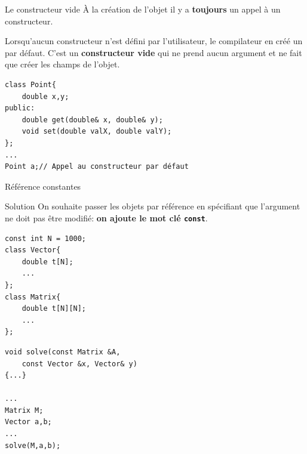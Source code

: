 \begin{frame}[fragile=singleslide]{Le constructeur vide}
    À la création de l'objet il y a \textbf{toujours} un appel à un constructeur.

    Lorsqu'aucun constructeur n'est défini par l'utilisateur, le compilateur en créé un par défaut.
    C'est un \textbf{constructeur vide} qui ne prend aucun argument et ne fait que créer les champs de l'objet.
        \begin{verbatim}
class Point{
    double x,y;
public:
    double get(double& x, double& y);
    void set(double valX, double valY);
};
...
Point a;// Appel au constructeur par défaut
        \end{verbatim}
    
\end{frame}


\begin{frame}[fragile=singleslide]{Référence constantes}
    \begin{block}{Solution}
        On souhaite passer les objets par référence en spécifiant que l'argument ne doit pas être modifié: \textbf{on ajoute le mot clé \texttt{const}}.
    \end{block}
    \begin{minipage}{0.44\linewidth}
            \begin{verbatim}
const int N = 1000;
class Vector{
    double t[N];
    ...
};
class Matrix{
    double t[N][N];
    ...
};
            \end{verbatim}
    \end{minipage}
    \hfill
    \begin{minipage}{0.50\linewidth}
            \begin{verbatim}
void solve(const Matrix &A,
    const Vector &x, Vector& y)
{...}

...
Matrix M;
Vector a,b;
...
solve(M,a,b);
            \end{verbatim}
    \end{minipage}
\end{frame}

